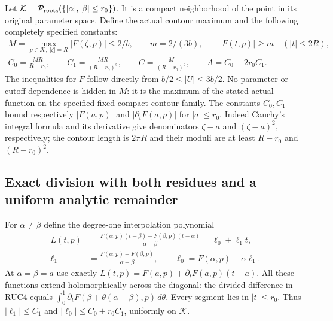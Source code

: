 \documentclass[11pt]{article}
\begin{document}
Let $\mathcal K=\mathcal P_{\rm roots}
(\{|\alpha|,|\beta|\le r_0\})$.  It is a compact neighborhood of
the point in its original parameter space.  Define the actual
contour maximum and the following completely specified constants:
\[
 \begin{gathered}
 M=\max_{p\in\mathcal K,\ |\zeta|=R}|F(\zeta,p)|\le2/b,
 \qquad m=2/(3b),\qquad |F(t,p)|\ge m\quad(|t|\le2R),\\
 C_0=\frac{MR}{R-r_0},\qquad C_1=\frac{MR}{(R-r_0)^2},\qquad
 C=\frac{M}{(R-r_0)^2},\qquad A=C_0+2r_0C_1.
 \end{gathered}\tag{RUC3}
\]
The inequalities for $F$ follow directly from
$b/2\le|U|\le3b/2$.  No parameter or cutoff dependence is hidden
in $M$: it is the maximum of the stated actual function on the
specified fixed compact contour family.  The constants $C_0,C_1$
bound respectively $|F(a,p)|$ and $|\partial_tF(a,p)|$ for
$|a|\le r_0$.  Indeed Cauchy's integral formula and its derivative
give denominators $\zeta-a$ and $(\zeta-a)^2$, respectively;
the contour length is $2\pi R$ and their moduli are at least
$R-r_0$ and $(R-r_0)^2$.

\subsection{Exact division with both residues and a uniform analytic remainder}

For $\alpha\ne\beta$ define the degree-one interpolation polynomial
\[
 \begin{aligned}
 L(t,p)&=\frac{F(\alpha,p)(t-\beta)-F(\beta,p)(t-\alpha)}
                     {\alpha-\beta}=\ell_0+\ell_1t,\\
 \ell_1&=\frac{F(\alpha,p)-F(\beta,p)}{\alpha-\beta},\qquad
 \ell_0=F(\alpha,p)-\alpha\ell_1.
 \end{aligned}\tag{RUC4}
\]
At $\alpha=\beta=a$ use exactly
$L(t,p)=F(a,p)+\partial_tF(a,p)(t-a)$.
All these functions extend holomorphically across the diagonal:
the divided difference in RUC4 equals
$\int_0^1\partial_tF(\beta+\theta(\alpha-\beta),p)\,d\theta$.
Every segment lies in $|t|\le r_0$.
Thus $|\ell_1|\le C_1$ and
$|\ell_0|\le C_0+r_0C_1$, uniformly on $\mathcal K$.
\end{document}
